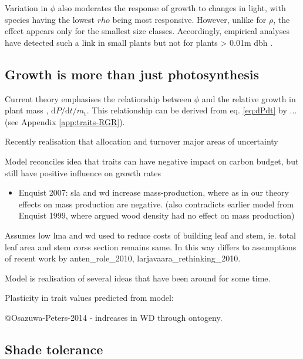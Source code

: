 \documentclass[12pt, a4paper]{article}
\begin{document}
Variation in $\phi$ also moderates the response of growth to changes
in light, with species having the lowest $rho$ being most responsive.
However, unlike for $\rho$, the effect appears only for the smallest
size classes. Accordingly, empirical analyses have detected such a link
in small plants but not for plants \textgreater{} 0.01m
dbh \citep{ruger-2012}.

\subsection{Growth is more than just photosynthesis}\label{tree-growth-is-more-than-just-photosynthesis}

Current theory emphasises the relationship between $\phi$ and the relative growth in plant mass
\citep{lambers-1992, cornelissen-1996, wright_cross-2000,  enquist-2007},
$\textrm{d}P / \textrm{d}t / m_\textrm{t}$. This relationship can be derived from eq. \ref{eq:dPdt}  by ...
(see Appendix \ref{app:traits-RGR}).

Recently realisation that allocation and turnover major areas of
uncertainty

Model reconciles idea that traits can have negative impact on carbon
budget, but still have positive influence on growth rates

\begin{itemize}
\itemsep1pt\parskip0pt
\item
  Enquist 2007: sla and wd increase mass-production, where as in our
  theory effects on mass production are negative. (also contradicts
  earlier model from Enquist 1999, where argued wood density had no
  effect on mass production)
\end{itemize}

Assumes low lma and wd used to reduce costs of building leaf and stem,
ie. total leaf area and stem corss section remains same. In this way
differs to assumptions of recent work by anten\_role\_2010,
larjavaara\_rethinking\_2010.

Model is realisation of several ideas that have been around for some
time.

Plasticity in trait values predicted from model:

@Osazuwa-Peters-2014 - indreases in WD through ontogeny.

\subsection{Shade tolerance}\label{how-traits-influence-growth-rate}
\end{document}
